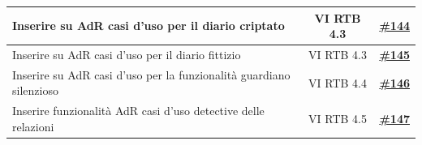 \documentclass[a4paper,12pt]{article}
\newcommand{\ignoreglossary}{}
\begin{document}
\begin{center}
\begin{longtable}{|p{}|c|c|}
\hline
\rowcolor{gray!20}
Inserire su AdR casi d'uso per il diario criptato & VI \ignoreglossary{RTB} 4.3 & \href{https://github.com/SWE-BitByBit/SWE-docs/issues/144}{\textbf{\#144}} \\
\hline
\rowcolor{white}
Inserire su AdR casi d'uso per il diario fittizio & VI \ignoreglossary{RTB} 4.3 & \href{https://github.com/SWE-BitByBit/SWE-docs/issues/145}{\textbf{\#145}} \\
\hline
\rowcolor{gray!20}
Inserire su AdR casi d'uso per la funzionalità guardiano silenzioso & VI \ignoreglossary{RTB} 4.4 & \href{https://github.com/SWE-BitByBit/SWE-docs/issues/146}{\textbf{\#146}} \\
\hline
\rowcolor{white}
Inserire funzionalità AdR casi d'uso detective delle relazioni & VI \ignoreglossary{RTB} 4.5 & \href{https://github.com/SWE-BitByBit/SWE-docs/issues/147}{\textbf{\#147}} \\
\hline
\end{longtable}
\end{center}
\end{document}
